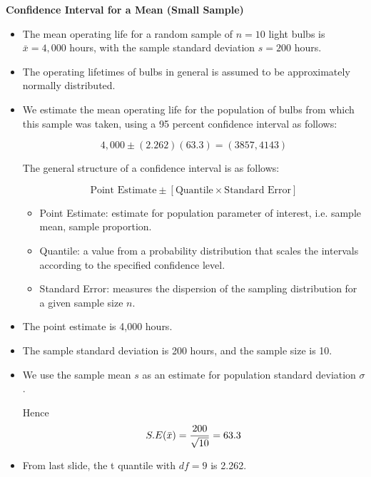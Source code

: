 \textbf{Confidence Interval for a Mean (Small Sample)}
\begin{itemize}
\item  The mean operating life for a random sample of $n = 10$ light bulbs is $\bar{x} = 4,000$ hours, with the sample
standard deviation $s = 200$ hours. \item  The operating lifetimes of bulbs in general is assumed to be approximately normally distributed.\item 
We estimate the mean operating life for the population of bulbs from which this sample was taken, using a 95 percent
confidence interval as follows:

\[4,000\pm(2.262)(63.3)  = (3857,4143)\]



\begin{framed}
The general structure of a confidence interval is as follows:

\[ \mbox{Point Estimate}  \pm \left[ \mbox{Quantile} \times \mbox{Standard Error} \right] \]


\begin{itemize}
\item Point Estimate: estimate for population parameter of interest, i.e. sample mean, sample proportion.
\item Quantile: a value from a probability distribution that scales the intervals according to the specified confidence level.
\item Standard Error: measures the dispersion of the sampling distribution for a given sample size $n$.
\end{itemize}
\end{framed}


\item The point estimate is 4,000 hours. 
\item The sample standard deviation is 200 hours, and the sample size is 10. 

\item We use the sample mean $s$ as an estimate for population standard deviation $\sigma$.

Hence \[S.E(\bar{x} ) = { 200 \over \sqrt{10}} = 63.3\]

\item  From last slide, the t quantile with $df=9$ is 2.262.
\end{itemize}



